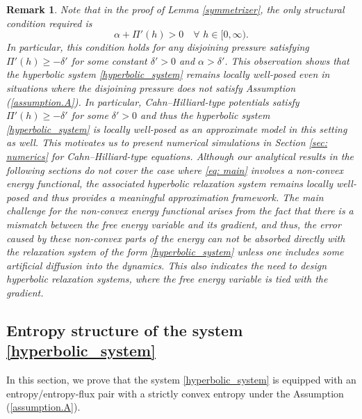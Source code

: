 \documentclass[11pt]{article}
\numberwithin{equation}{section}
\newtheorem{counter example}[theorem]{Counter Example}
\newtheorem{remark}[theorem] {Remark}
\numberwithin{equation}{section}
\numberwithin{equation}{section}
\begin{document}
\begin{remark}
Note that in the proof of Lemma \ref{symmetrizer}, the only structural condition required is
\[
\alpha+\Pi'(h)>0\quad \forall\,\, h\in [0, \infty).
\] 
In particular, this condition holds for any disjoining pressure satisfying $\Pi'(h)\geq -\delta'$ for some constant $\delta'>0$ and $\alpha>\delta'$. This observation shows that the hyperbolic system \eqref{hyperbolic_system} remains locally well-posed even in situations where the disjoining pressure does not satisfy Assumption (\ref{assumption.A}). In particular, Cahn–Hilliard-type potentials \cite{elliott1996cahn} satisfy $\Pi'(h)\geq -\delta'$ for some $\delta'>0$ and thus the hyperbolic system \eqref{hyperbolic_system} is locally well-posed as an approximate model in this setting as well. This motivates us to present numerical simulations in Section \ref{sec: numerics} for Cahn–Hilliard-type equations. Although our analytical results in the following sections do not cover the case where \eqref{eq: main} involves a non-convex energy functional, the associated hyperbolic relaxation system remains locally well-posed and thus provides a meaningful approximation framework. The main challenge for the non-convex energy functional arises from the fact that there is a mismatch between the free energy variable and its gradient, and thus, the error caused by these non-convex parts of the energy can not be absorbed directly with the relaxation system of the form \eqref{hyperbolic_system} unless one includes some artificial diffusion into the dynamics. This also indicates the need to design hyperbolic relaxation systems, where the free energy variable is tied with the gradient. 
\end{remark}
\subsection{Entropy structure of the system \eqref{hyperbolic_system}}\label{sec: wellposedness}
In this section, we prove that the system \eqref{hyperbolic_system} is equipped with an entropy/entropy-flux pair with a strictly convex entropy under the Assumption (\ref{assumption.A}). 
\end{document}
